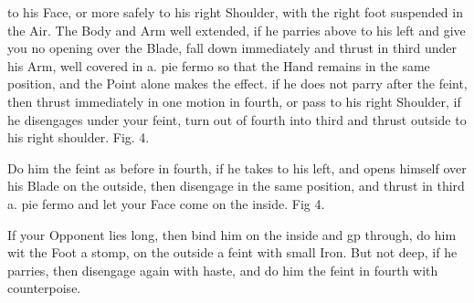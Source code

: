 \newpage


\newpage


to his Face, or more safely to his right Shoulder, with the right foot
suspended in the Air. The Body and Arm well extended, if he parries
above to his left and give you no opening over the Blade, fall down
immediately and thrust in third under his Arm, well covered in a. pie
fermo so that the Hand remains in the same position, and the Point
alone makes the effect. if he does not parry after the feint, then
thrust immediately in one motion in fourth, or pass to his right
Shoulder, if he disengages under your feint, turn out of fourth into
third and thrust outside to his right shoulder. Fig. 4.

\exercise{}
Do him the feint as before in fourth, if he takes to his left, and
opens himself over his Blade on the outside, then disengage in the
same position, and thrust in third a. pie fermo and let your Face come
on the inside. Fig 4.

If your Opponent lies long, then bind him on the inside and gp
through, do him wit the Foot a stomp, on the outside a feint with
small Iron. But not deep, if he parries, then disengage again with
haste, and do him the feint in fourth with counterpoise.

